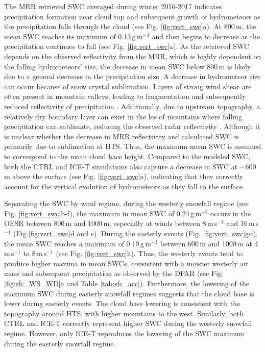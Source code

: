 \documentclass{ametsocV5}
\begin{document}
		The MRR retrieved SWC averaged during winter 2016-2017 indicates precipitation formation near cloud top and subsequent growth of hydrometeors as the precipitation falls through the cloud (see Fig. \ref{fig:vert_swc}a). At 800\,m, the mean SWC reaches its maximum of 0.13\,g\,m$^{-3}$ and then begins to decrease as the precipitation continues to fall (see Fig. \ref{fig:vert_swc}a). 
		As the retrieved SWC depends on the observed reflectivity from the MRR, which is highly dependent on the falling hydrometeors' size, the decrease in mean SWC below 800\,m is likely due to a general decrease in the precipitation size. A decrease in hydrometeor size can occur because of snow crystal sublimation. Layers of strong wind shear are often present in mountain valleys, leading to fragmentation and subsequently reduced reflectivity of precipitation \citep{ramelli_influence_2020}. Additionally, due to upstream topography, a relatively dry boundary layer can exist in the lee of mountains where falling precipitation can sublimate, reducing the observed radar reflectivity \citep[e.g.,][]{ramelli_microphysical_2020}. Although it is unclear whether the decrease in MRR reflectivity and calculated SWC is primarily due to sublimation at HTS. 
		Thus, the maximum mean SWC is assumed to correspond to the mean cloud base height. Compared to the modeled SWC, both the CTRL and ICE-T simulations also capture a decrease in SWC at $\sim$600\,m above the surface (see Fig. \ref{fig:vert_swc}a), indicating that they correctly account for the vertical evolution of hydrometeors as they fall to the surface.

		Separating the SWC by wind regime, during the westerly snowfall regime (see Fig. \ref{fig:vert_swc}b-f), the maximum in mean SWC of 0.24\,g\,m$^{-3}$ occurs in the OESR between 800\,m and 1000\,m, especially at winds between 8\,m\,s$^{-1}$ and 16\,m\,s$^{-1}$ (Fig.\ref{fig:vert_swc}d and e). During the easterly events (Fig. \ref{fig:vert_swc}g-i), the mean SWC reaches a maximum of 0.19\,g\,m$^{-3}$ between 600\,m and 1000\,m at 4\,m\,s$^{-1}$ to 8\,m\,s$^{-1}$ (see Fig. \ref{fig:vert_swc}h). Thus, the westerly events tend to produce higher maxima in mean SWCs, consistent with a moister westerly air mass and subsequent precipitation as observed by the DFAR (see Fig \ref{fig:sfc_WS_WD}a and Table \ref{tab:sfc_acc}). Furthermore, the lowering of the maximum SWC during easterly snowfall regimes suggests that the cloud base is lower during easterly events. The cloud base lowering is consistent with the topography around HTS, with higher mountains to the west. Similarly, both CTRL and ICE-T correctly represent higher SWC during the westerly snowfall regime. However, only ICE-T reproduces the lowering of the SWC maximum during the easterly snowfall regime. 
		
\end{document}
